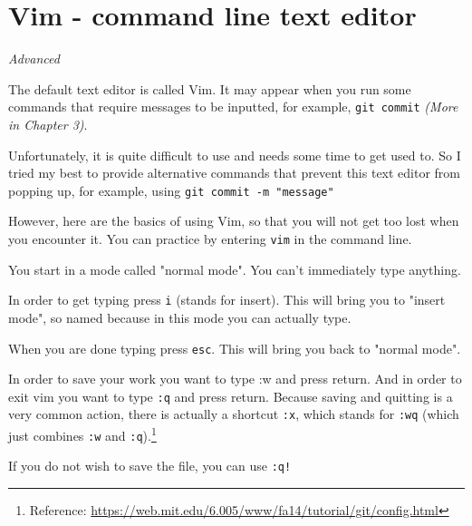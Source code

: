 \section{Vim - command line text editor}

\textit{Advanced}
\vspace{6mm}

The default text editor is called Vim. It may appear when you run some commands that require messages to be inputted, for example, \texttt{git commit} \textit{(More in Chapter 3)}.

Unfortunately, it is quite difficult to use and needs some time to get used to. So I tried my best to provide alternative commands that prevent this text editor from popping up, for example, using \texttt{git commit -m "message"}

However, here are the basics of using Vim, so that you will not get too lost when you encounter it. You can practice by entering \texttt{vim} in the command line.

You start in a mode called "normal mode". You can’t immediately type anything.

In order to get typing press \texttt{i} (stands for insert). This will bring you to "insert mode", so named because in this mode you can actually type.

When you are done typing press \texttt{esc}. This will bring you back to "normal mode".

In order to save your work you want to type :w and press return. And in order to exit vim you want to type \texttt{:q} and press return. Because saving and quitting is a very common action, there is actually a shortcut \texttt{:x}, which stands for \texttt{:wq} (which just combines \texttt{:w} and \texttt{:q}).\footnote{Reference: \url{https://web.mit.edu/6.005/www/fa14/tutorial/git/config.html}}


If you do not wish to save the file, you can use \texttt{:q!}


